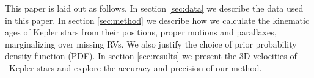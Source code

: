 
This paper is laid out as follows.
In section \ref{sec:data} we describe the data used in this paper.
In section \ref{sec:method} we describe how we calculate the kinematic ages of
Kepler stars from their positions, proper motions and parallaxes,
marginalizing over missing RVs.
We also justify the choice of prior probability density function (PDF).
In section \ref{sec:results} we present the 3D velocities of \nstars\ Kepler
stars and explore the accuracy and precision of our method.
